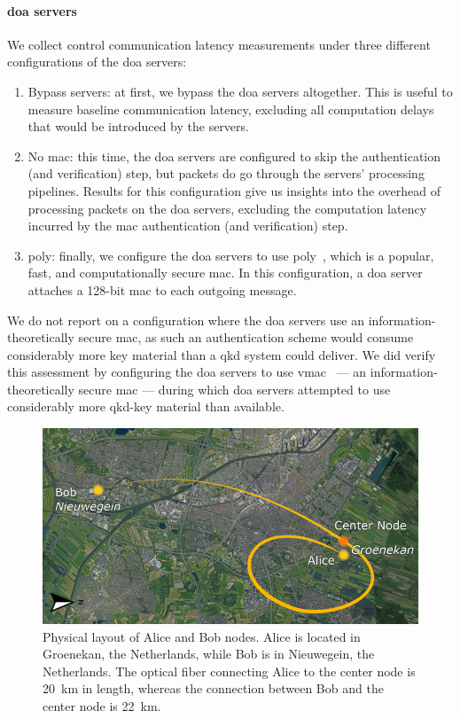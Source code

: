\paragraph{\acrshort{doa} servers}

We collect control communication latency measurements under three different configurations of the
\acrshort{doa} servers:

\begin{enumerate}
    \item Bypass servers: at first, we bypass the \acrshort{doa} servers altogether. This is useful
          to measure baseline communication latency, excluding all computation delays that would be
          introduced by the servers.
    \item No \acrshort{mac}: this time, the \acrshort{doa} servers are configured to skip the
          authentication (and verification) step, but packets do go through the servers' processing
          pipelines. Results for this configuration give us insights into the overhead of processing
          packets on the \acrshort{doa} servers, excluding the computation latency incurred by the
          \acrshort{mac} authentication (and verification) step.
    \item \acrshort{poly}: finally, we configure the \acrshort{doa} servers to use
          \acrshort{poly}~\cite{bernstein_2005_poly1305}, which is a popular, fast, and
          computationally secure \acrshort{mac}. In this configuration, a \acrshort{doa} server
          attaches a \num{128}-bit mac to each outgoing message.
\end{enumerate}

We do not report on a configuration where the \acrshort{doa} servers use an
information-theoretically secure \acrshort{mac}, as such an authentication scheme would consume
considerably more key material than a \acrshort{qkd} system could deliver. We did verify this
assessment by configuring the \acrshort{doa} servers to use
\acrshort{vmac}~\cite{krovetz_2007_message} --- an information-theoretically secure \acrshort{mac}
--- during which \acrshort{doa} servers attempted to use considerably more \acrshort{qkd}-key
material than available.

\begin{figure}[t]
    \centering
    \includegraphics[width=0.6\linewidth]{figures/mac-setup-qkd-locations-resized.png}
    \caption{
        Physical layout of Alice and Bob nodes. Alice is located in Groenekan, the Netherlands,
        while Bob is in Nieuwegein, the Netherlands. The optical fiber connecting Alice to the
        center node is \qty{20}{\km} in length, whereas the connection between Bob and the center
        node is \qty{22}{\km}.
    }
    \label{fig:mac-setup-qkd-locations}
\end{figure}

